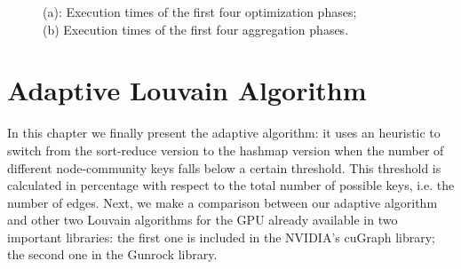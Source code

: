 \begin{figure}[t!]
	\caption{(a): Execution times of the first four optimization phases;\\(b) Execution times of the first four aggregation phases.}
\end{figure}
\newpage
\section{Adaptive Louvain Algorithm}\label{C7}
In this chapter we finally present the adaptive algorithm: it uses an heuristic to switch from the sort-reduce version to the hashmap version when the number of different node-community keys falls below a certain threshold. This threshold is calculated in percentage with respect to the total number of possible keys, i.e. the number of edges.
Next, we make a comparison between our adaptive algorithm and other two Louvain algorithms for the GPU already available in two important libraries: the first one is included in the NVIDIA's cuGraph library; the second one in the Gunrock library.
